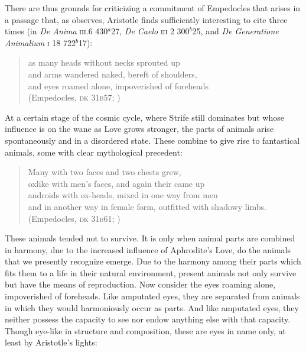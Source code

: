 There are thus grounds for criticizing a commitment of Empedocles that arises in a passage that, as \citet[211]{Wright:1981zr} observes, Aristotle finds sufficiently interesting to cite three times (in \emph{De Anima} \textsc{iii}.6 430\( ^{a} \)27, \emph{De Caelo} \textsc{iii} 2 300\( ^{b} \)25, and \emph{De Generatione Animalium} \textsc{i} 18 722\( ^{b} \)17):
\begin{verse}
	as many heads without necks sprouted up\\
	and arms wandered naked, bereft of shoulders,\\
	and eyes roamed alone, impoverished of foreheads\\
	(Empedocles, \textsc{dk} 31\textsc{b}57; \citealt[64 245]{Inwood:2001ve})
\end{verse}
At a certain stage of the cosmic cycle, where Strife still dominates but whose influence is on the wane as Love grows stronger, the parts of animals arise spontaneously and in a disordered state. These combine to give rise to fantastical animals, some with clear mythological precedent:
\begin{verse}
	Many with two faces and two chests grew,\\
	oxlike with men's faces, and again their came up\\
	androids with ox-heads, mixed in one way from men\\
	and in another way in female form, outfitted with shadowy limbs.\\
	(Empedocles, \textsc{dk} 31\textsc{b}61; \citealt[66 247]{Inwood:2001ve})
\end{verse}
These animals tended not to survive. It is only when animal parts are combined in harmony, due to the increased influence of Aphrodite's Love, do the animals that we presently recognize emerge. Due to the harmony among their parts which fits them to a life in their natural environment, present animals not only survive but have the means of reproduction. Now consider the eyes roaming alone, impoverished of foreheads. Like amputated eyes, they are separated from animals in which they would harmoniously occur as parts. And like amputated eyes, they neither possess the capacity to see nor endow anything else with that capacity. Though eye-like in structure and composition, these are eyes in name only, at least by Aristotle's lights:
